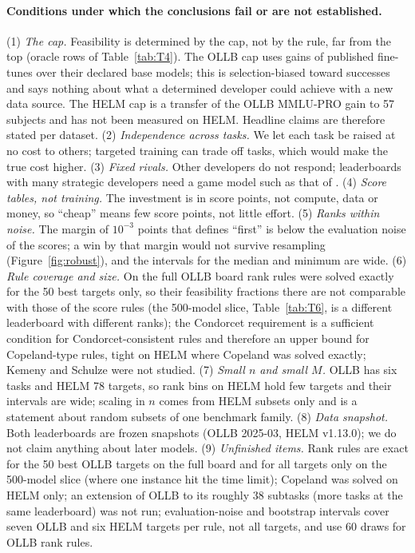 \documentclass{article}
\begin{document}
\paragraph{Conditions under which the conclusions fail or are not established.}
(1) \emph{The cap.} Feasibility is determined by the cap, not by the rule, far from the top (oracle rows of Table~\ref{tab:T4}). The OLLB cap uses gains of published fine-tunes over their declared base models; this is selection-biased toward successes and says nothing about what a determined developer could achieve with a new data source. The HELM cap is a transfer of the OLLB MMLU-PRO gain to 57 subjects and has not been measured on HELM. Headline claims are therefore stated per dataset. (2) \emph{Independence across tasks.} We let each task be raised at no cost to others; targeted training can trade off tasks, which would make the true cost higher. (3) \emph{Fixed rivals.} Other developers do not respond; leaderboards with many strategic developers need a game model such as that of \citet{chen2026incentives}. (4) \emph{Score tables, not training.} The investment is in score points, not compute, data or money, so ``cheap'' means few score points, not little effort. (5) \emph{Ranks within noise.} The margin of $10^{-3}$ points that defines ``first'' is below the evaluation noise of the scores; a win by that margin would not survive resampling (Figure~\ref{fig:robust}), and the intervals for the median and minimum are wide. (6) \emph{Rule coverage and size.} On the full OLLB board rank rules were solved exactly for the 50 best targets only, so their feasibility fractions there are not comparable with those of the score rules (the 500-model slice, Table~\ref{tab:T6}, is a different leaderboard with different ranks); the Condorcet requirement is a sufficient condition for Condorcet-consistent rules and therefore an upper bound for Copeland-type rules, tight on HELM where Copeland was solved exactly; Kemeny and Schulze were not studied. (7) \emph{Small $n$ and small $M$.} OLLB has six tasks and HELM 78 targets, so rank bins on HELM hold few targets and their intervals are wide; scaling in $n$ comes from HELM subsets only and is a statement about random subsets of one benchmark family. (8) \emph{Data snapshot.} Both leaderboards are frozen snapshots (OLLB 2025-03, HELM v1.13.0); we do not claim anything about later models. (9) \emph{Unfinished items.} Rank rules are exact for the 50 best OLLB targets on the full board and for all targets only on the 500-model slice (where one instance hit the time limit); Copeland was solved on HELM only; an extension of OLLB to its roughly 38 subtasks (more tasks at the same leaderboard) was not run; evaluation-noise and bootstrap intervals cover seven OLLB and six HELM targets per rule, not all targets, and use 60 draws for OLLB rank rules.
\end{document}

